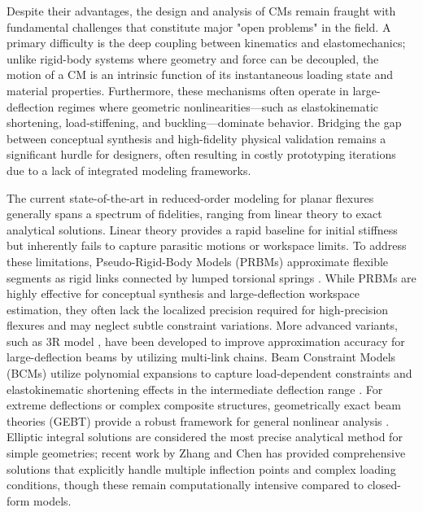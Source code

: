 \documentclass[colorlinks,upint,subscriptcorrection,varvw,hyphenate,balance]{asmeconf} %
\begin{document}
Despite their advantages, the design and analysis of CMs remain fraught with fundamental challenges that constitute major "open problems" in the field. A primary difficulty is the deep coupling between kinematics and elastomechanics; unlike rigid-body systems where geometry and force can be decoupled, the motion of a CM is an intrinsic function of its instantaneous loading state and material properties. Furthermore, these mechanisms often operate in large-deflection regimes where geometric nonlinearities---such as elastokinematic shortening, load-stiffening, and buckling---dominate behavior. Bridging the gap between conceptual synthesis and high-fidelity physical validation remains a significant hurdle for designers, often resulting in costly prototyping iterations due to a lack of integrated modeling frameworks.

The current state-of-the-art in reduced-order modeling for planar flexures generally spans a spectrum of fidelities, ranging from linear theory to exact analytical solutions. Linear theory provides a rapid baseline for initial stiffness but inherently fails to capture parasitic motions or workspace limits. To address these limitations, Pseudo-Rigid-Body Models (PRBMs) approximate flexible segments as rigid links connected by lumped torsional springs \cite{Howell1994, Howell1995}. While PRBMs are highly effective for conceptual synthesis and large-deflection workspace estimation, they often lack the localized precision required for high-precision flexures and may neglect subtle constraint variations. More advanced variants, such as 3R model \cite{Su2009PRB3R}, have been developed to improve approximation accuracy for large-deflection beams by utilizing multi-link chains. Beam Constraint Models (BCMs) utilize polynomial expansions to capture load-dependent constraints and elastokinematic shortening effects in the intermediate deflection range \cite{awtar2007characteristics, AwtarSen2010}. For extreme deflections or complex composite structures, geometrically exact beam theories (GEBT) provide a robust framework for general nonlinear analysis \cite{Yu2012GEBTAG}. Elliptic integral solutions are considered the most precise analytical method for simple geometries; recent work by Zhang and Chen \cite{zhang2013comprehensive} has provided comprehensive solutions that explicitly handle multiple inflection points and complex loading conditions, though these remain computationally intensive compared to closed-form models.
\end{document}
